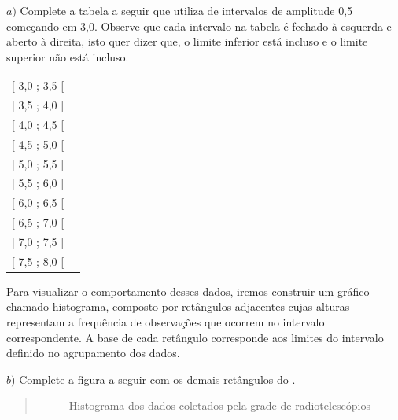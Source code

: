 \(a)\) Complete a tabela a seguir que utiliza de intervalos de amplitude 0,5 começando em 3,0. Observe que cada intervalo na tabela é fechado à esquerda e aberto à direita, isto quer dizer que, o limite inferior está incluso e o limite superior não está incluso.


\begin{savenotes}\sphinxattablestart
\centering
\begin{tabulary}{\linewidth}[t]{|T|T|}
\hline
{}\relax &\relax \\
\hline
{[} 3,0 ; 3,5 {[}
&\\
\hline
{[} 3,5 ; 4,0 {[}
&\\
\hline
{[} 4,0 ; 4,5 {[}
&\\
\hline
{[} 4,5 ; 5,0 {[}
&\\
\hline
{[} 5,0 ; 5,5 {[}
&\\
\hline
{[} 5,5 ; 6,0 {[}
&\\
\hline
{[} 6,0 ; 6,5 {[}
&\\
\hline
{[} 6,5 ; 7,0 {[}
&\\
\hline
{[} 7,0 ; 7,5 {[}
&\\
\hline
{[} 7,5 ; 8,0 {[}
&\\
\hline
\end{tabulary}
\par
\sphinxattableend\end{savenotes}

Para visualizar o comportamento desses dados, iremos construir um gráfico chamado histograma, composto por retângulos adjacentes cujas alturas representam a frequência de observações que ocorrem no intervalo correspondente. A base de cada retângulo corresponde aos limites do intervalo definido no agrupamento dos dados.

\(b)\) Complete a figura a seguir com os demais retângulos do {\hyperref[\detokenize{PE103-3:fig-histograma}]{}}.
\begin{quote}

\begin{figure}[H]
\centering
\capstart

\noindent{}
\caption{Histograma dos dados coletados pela grade de radiotelescópios}\label{\detokenize{PE103-3:fig-histograma}}\label{\detokenize{PE103-3:id2}}\end{figure}
\end{quote}

